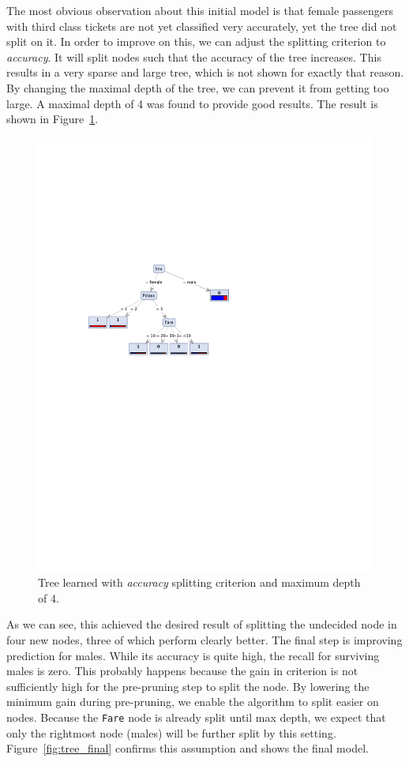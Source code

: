\documentclass[11pt,a4paper]{article}
\begin{document}
\par The most obvious observation about this initial model is that female passengers with third class tickets are not yet classified very accurately, yet the tree did not split on it. In order to improve on this, we can adjust the splitting criterion to \emph{accuracy}. It will split nodes such that the accuracy of the tree increases. This results in a very sparse and large tree, which is not shown for exactly that reason. By changing the maximal depth of the tree, we can prevent it from getting too large. A maximal depth of 4 was found to provide good results. The result is shown in Figure~\ref{fig:tree_accuracy}.
\begin{figure}[htbp]
  \centering
  \includegraphics[width = .6\textwidth]{tree_accuracy}
  \captionsetup{width=.8\textwidth}
  \caption{Tree learned with \emph{accuracy} splitting criterion and maximum depth of 4.}
  \label{fig:tree_accuracy}
\end{figure}
As we can see, this achieved the desired result of splitting the undecided node in four new nodes, three of which perform clearly better. The final step is improving prediction for males. While its accuracy is quite high, the recall for surviving males is zero. This probably happens because the gain in criterion is not sufficiently high for the pre-pruning step to split the node. By lowering the minimum gain during pre-pruning, we enable the algorithm to split easier on nodes. Because the \texttt{Fare} node is already split until max depth, we expect that only the rightmost node (males) will be further split by this setting. Figure~\ref{fig:tree_final} confirms this assumption and shows the final model. 
\end{document}
